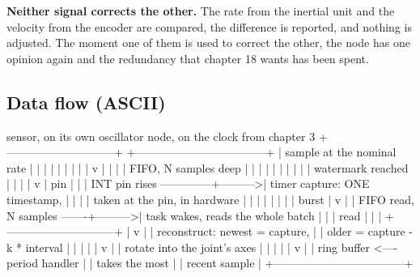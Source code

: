 \textbf{Neither signal corrects the other.} The rate from the inertial unit and
the velocity from the encoder are compared, the difference is reported, and
nothing is adjusted. The moment one of them is used to correct the other, the
node has one opinion again and the redundancy that chapter 18 wants has been
spent.

\subsection*{Data flow (ASCII)}

\begin{asciiart}
  sensor, on its own oscillator            node, on the clock from chapter 3
  +-----------------------------+          +-----------------------------------+
  | sample at the nominal rate  |          |                                   |
  |   |                         |          |                                   |
  |   v                         |          |                                   |
  | FIFO, N samples deep        |          |                                   |
  |   |                         |          |                                   |
  |   | watermark reached       |          |                                   |
  |   v                         |  pin     |                                   |
  | INT pin rises --------------+--------->| timer capture: ONE timestamp,     |
  |                             |          |   taken at the pin, in hardware   |
  |                             |          |     |                             |
  |                             |  burst   |     v                             |
  | FIFO read, N samples -------+--------->| task wakes, reads the whole batch |
  |                             |  read    |     |                             |
  +-----------------------------+          |     v                             |
                                           | reconstruct: newest = capture,    |
                                           |   older = capture - k * interval  |
                                           |     |                             |
                                           |     v                             |
                                           | rotate into the joint's axes      |
                                           |     |                             |
                                           |     v                             |
                                           | ring buffer <---- period handler  |
                                           |                    takes the most |
                                           |                    recent sample  |
                                           +-----------------------------------+
\end{asciiart}

